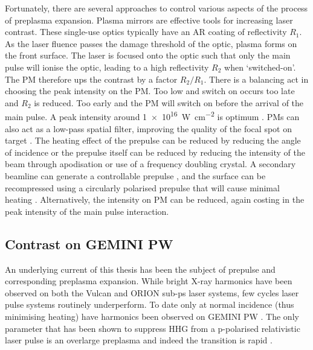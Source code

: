 Fortunately, there are several approaches to control various aspects of the process of preplasma expansion. Plasma mirrors are effective tools for increasing laser contrast. These single-use optics typically have an \ac{AR} coating of reflectivity $R_1$. As the laser fluence passes the damage threshold of the optic, plasma forms on the front surface. The laser is focused onto the optic such that only the main pulse will ionise the optic, leading to a high reflectivity $R_2$ when `switched-on'. The \ac{PM} therefore ups the contrast by a factor $R_2/R_1$. There is a balancing act in choosing the peak intensity on the \ac{PM}. Too low and switch on occurs too late and $R_2$ is reduced. Too early and the PM will switch on before the arrival of the main pulse. A peak intensity around \qty{1e16}{W.cm^{-2}} is optimum \cite{caiTimeresolvedMeasurementsReflectivity2009}. PMs can also act as a low-pass spatial filter, improving the quality of the focal spot on target \cite{doumyCompleteCharacterizationPlasma2004}. The heating effect of the prepulse can be reduced by reducing the angle of incidence or the prepulse itself can be reduced by reducing the intensity of the beam through apodisation or use of a frequency doubling crystal. A secondary beamline can generate a controllable prepulse \cite{kahalyDirectObservationDensityGradient2013}, and the surface can be recompressed using a circularly polarised prepulse that will cause minimal heating \cite{liExperimentalDemonstrationEfficient2022}. Alternatively, the intensity on PM can be reduced, again costing in the peak intensity of the main pulse interaction.




\subsection{Contrast on GEMINI PW}

An underlying current of this thesis has been the subject of prepulse and corresponding preplasma expansion. While bright X-ray harmonics have been observed on both the Vulcan \cite{dromeyBrightMultikeVHarmonic2007} and ORION sub-ps laser systems, few cycles laser pulse systems routinely underperform. To date only at normal incidence (thus minimising heating) have harmonics been observed on GEMINI PW \cite{dromeyCoherentSynchrotronEmission2013}. The only parameter that has been shown to suppress HHG from a p-polarised relativistic laser pulse is an overlarge preplasma \cite{dollarScalingHighorderHarmonic2013} and indeed the transition is rapid \cite{kahalyDirectObservationDensityGradient2013}.

